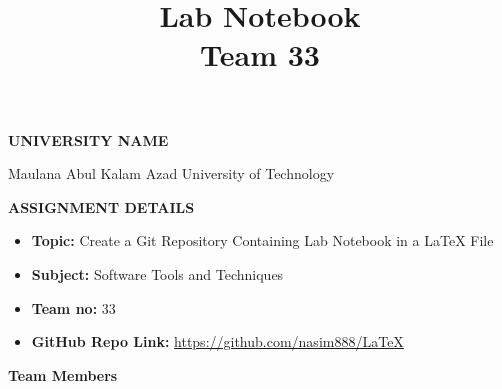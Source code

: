\documentclass{article}
\title{Lab Notebook\\Team 33}
\date{}
\begin{document}
\maketitle

\begin{center}
    \textbf{UNIVERSITY NAME}
    
    Maulana Abul Kalam Azad University of Technology
\end{center}

\vspace{1cm}

\begin{center}
    \textbf{ASSIGNMENT DETAILS}
\end{center}

\begin{itemize}[leftmargin=*]
    \item \textbf{Topic:} Create a Git Repository Containing Lab Notebook in a LaTeX File
    \item \textbf{Subject:} Software Tools and Techniques
    \item \textbf{Team no:} 33
    \item \textbf{GitHub Repo Link:} \url{https://github.com/nasim888/LaTeX}
\end{itemize}

\vspace{1cm}

\begin{center}
    \textbf{Team Members}
\end{center}

\vspace{0.5cm}
\end{document}
